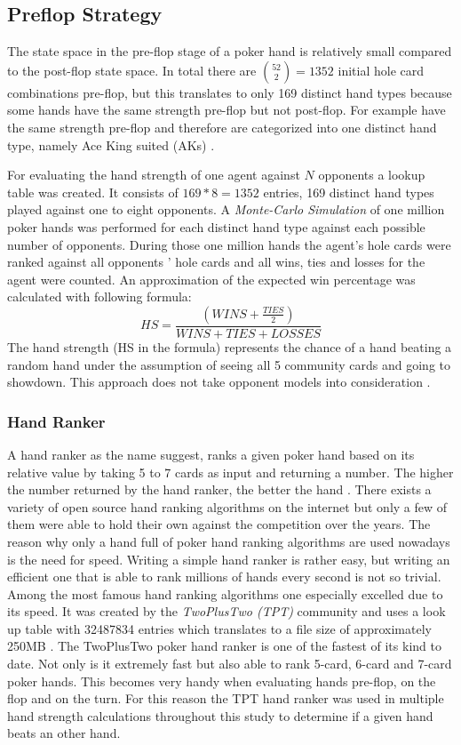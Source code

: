\subsection{Preflop Strategy}
The state space in the pre-flop stage of a poker hand is relatively small compared to the post-flop state space. In total there are ${52\choose 2} = 1352$ initial hole card combinations pre-flop, but this translates to only 169 distinct hand types because some hands have the same strength pre-flop but not post-flop. For example  have the same strength pre-flop and therefore are categorized into one distinct hand type, namely Ace King suited (AKs) \cite{opp_master}. \par
For evaluating the hand strength of one agent against $N$ opponents a lookup table was created. It consists of $169 * 8 = 1352$ entries, 169 distinct hand types played against one to eight opponents. A \textit{Monte-Carlo Simulation} of one million poker hands was performed for each distinct hand type against each possible number of opponents. During those one million hands the agent's hole cards were ranked against all opponents ' hole cards and all wins, ties and losses for the agent were counted. An approximation of the expected win percentage was calculated with following formula:
\begin{equation}
\label{eq:hs}
HS =  \frac{(WINS + \frac{TIES}{2})}{WINS + TIES + LOSSES}
\end{equation}
The hand strength (HS in the formula) represents the chance of a hand beating a random hand under the assumption of seeing all 5 community cards and going to showdown. This approach does not take opponent models into consideration \cite{opp_master}. \par
\subsubsection{Hand Ranker}
A hand ranker as the name suggest, ranks a given poker hand based on its relative value by taking 5 to 7 cards as input and returning a number. The higher the number returned by the hand ranker, the better the hand \cite{hand_eval}. There exists a variety of open source hand ranking algorithms on the internet but only a few of them were able to hold their own against the competition over the years. The reason why only a hand full of poker hand ranking algorithms are used nowadays is the need for speed. Writing a simple hand ranker is rather easy, but writing an efficient one that is able to rank millions of hands every second is not so trivial. Among the most famous hand ranking algorithms one especially excelled due to its speed. It was created by the \textit{TwoPlusTwo (TPT)} community and uses a look up table with 32487834 entries which translates to a file size of approximately 250MB \cite{hand_eval}. The TwoPlusTwo poker hand ranker is one of the fastest of its kind to date. Not only is it extremely fast but also able to rank 5-card, 6-card and 7-card poker hands. This becomes very handy when evaluating hands pre-flop, on the flop and on the turn. For this reason the TPT hand ranker was used in multiple hand strength calculations throughout this study to determine if a given hand beats an other hand. 
